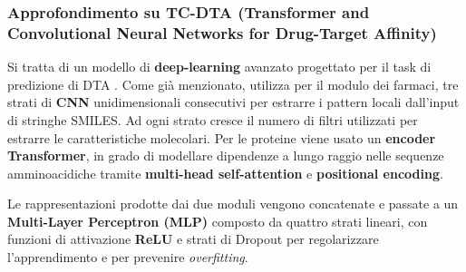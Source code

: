 \subsubsection{Approfondimento su TC-DTA (Transformer and Convolutional Neural Networks for Drug-Target Affinity)}
Si tratta di un modello di \textbf{deep-learning} avanzato progettato per il task di predizione di DTA \cite{tangTCDTAPredictingDrugTarget2024a}. Come già menzionato, utilizza per il modulo dei farmaci, tre strati di \textbf{CNN} unidimensionali consecutivi per estrarre i pattern locali dall'input di stringhe SMILES.
Ad ogni strato cresce il numero di filtri utilizzati per estrarre le caratteristiche molecolari.
Per le proteine viene usato un \textbf{encoder Transformer}, in grado di modellare dipendenze a lungo raggio nelle sequenze amminoacidiche tramite \textbf{multi-head self-attention} e \textbf{positional encoding}.

Le rappresentazioni prodotte dai due moduli vengono concatenate e passate a un \textbf{Multi-Layer Perceptron (MLP)} composto da quattro strati lineari, con funzioni di attivazione \textbf{ReLU} e strati di Dropout per regolarizzare l'apprendimento e per prevenire \textit{overfitting}.


